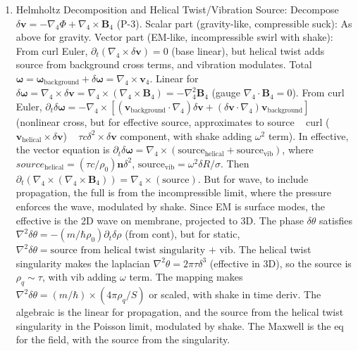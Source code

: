 \begin{enumerate}
\item Helmholtz Decomposition and Helical Twist/Vibration Source: Decompose $\delta\mathbf{v} = - \nabla_4 \Phi + \nabla_4 \times \mathbf{B}_4$ (P-3). Scalar part (gravity-like, compressible suck): As above for gravity. Vector part (EM-like, incompressible swirl with shake): From curl Euler, $\partial_t (\nabla_4 \times \delta\mathbf{v}) = 0$ (base linear), but helical twist adds source from background cross terms, and vibration modulates. Total $\boldsymbol{\omega} = \boldsymbol{\omega}_{\text{background}} + \delta\boldsymbol{\omega} = \nabla_4 \times \mathbf{v}_4$. Linear for $\delta\boldsymbol{\omega} = \nabla_4 \times \delta\mathbf{v} = \nabla_4 \times (\nabla_4 \times \mathbf{B}_4) = - \nabla_4^2 \mathbf{B}_4$ (gauge $\nabla_4 \cdot \mathbf{B}_4 = 0$). From curl Euler, $\partial_t \delta\boldsymbol{\omega} = - \nabla_4 \times [(\mathbf{v}_{\text{background}} \cdot \nabla_4) \delta\mathbf{v} + (\delta\mathbf{v} \cdot \nabla_4) \mathbf{v}_{\text{background}}]$ (nonlinear cross, but for effective source, approximates to source ~ curl ($\mathbf{v}_{\text{helical}} \times \delta\mathbf{v}$) ~ $\tau c \delta^2 \times \delta\mathbf{v}$ component, with shake adding $\omega^2$ term). In effective, the vector equation is $\partial_t \delta\boldsymbol{\omega} = \nabla_4 \times (\text{source}_{\text{helical}} + \text{source}_{\text{vib}})$, where $source_{\text{helical}} = (\tau c / \rho_0) \mathbf{n} \delta^2$, $\text{source}_\text{vib} = \omega^2 \delta R / \sigma$. Then $\partial_t (\nabla_4 \times (\nabla_4 \times \mathbf{B}_4)) = \nabla_4 \times (\text{source})$. But for wave, to include propagation, the full is from the incompressible limit, where the pressure enforces the wave, modulated by shake. Since EM is surface modes, the effective is the 2D wave on membrane, projected to 3D. The phase $\delta\theta$ satisfies $\nabla^2 \delta\theta = - (m / \hbar \rho_0) \partial_t \delta\rho$ (from cont), but for static, $\nabla^2 \delta\theta = \text{source from helical twist singularity + vib}$. The helical twist singularity makes the laplacian $\nabla^2 \theta = 2\pi \tau \delta^3$ (effective in 3D), so the source is $\rho_q \sim \tau$, with vib adding $\omega$ term. The mapping makes $\nabla^2 \delta\theta = (m / \hbar) \times (4\pi \rho_q / S)$ or scaled, with shake in time deriv. The algebraic is the linear for propagation, and the source from the helical twist singularity in the Poisson limit, modulated by shake. The Maxwell is the eq for the field, with the source from the singularity.
\end{enumerate}

